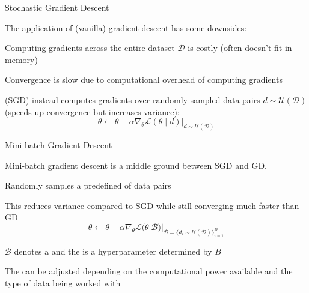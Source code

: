 \begin{frame}[t]{Stochastic Gradient Descent}

\begin{problembox}
    The application of (vanilla) gradient descent has some downsides:
    \blist
        \item Computing gradients across the entire dataset $\mathcal{D}$ is costly (often doesn't fit in memory)
        \item Convergence is slow due to computational overhead of computing gradients
    \elist
    \vspace{-1em}
\end{problembox}
\begin{solutionbox}
     (SGD) instead computes gradients over randomly sampled data pairs $d \sim \mathcal{U(\mathcal{D})}$ (speeds up convergence but increases variance): 
    \begin{equation*}
        \theta \leftarrow \theta - \alpha \nabla_\theta \mathcal{L}(\theta \mid d)\lvert_{d \sim \mathcal{U(\mathcal{D})}}
    \end{equation*}
\end{solutionbox}
    
\end{frame}

\begin{frame}[t]{Mini-batch Gradient Descent}

    Mini-batch gradient descent is a middle ground between SGD and GD.

    \blist
        \item Randomly samples a predefined  of data pairs 
        \item This reduces variance compared to SGD while still converging much faster than GD
    \elist
    \vspace{0pt}
    \[
    \theta \leftarrow \theta - \alpha \nabla_\theta \mathcal{L}(\theta|\mathcal{B})|_{\mathcal{B} = \{d_i \sim \mathcal{U(\mathcal{D})}\}^B_{i=1}}
    \]

    \blist
        \item $\mathcal{B}$ denotes a  and the  is a hyperparameter determined by $B$
        \item The  can be adjusted depending on the computational power available and the type of data being worked with
    \elist
    
\end{frame}

